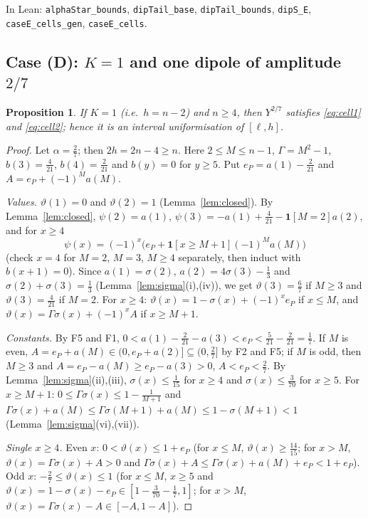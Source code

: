 \documentclass[11pt]{amsart}
\newtheorem{proposition}[lemma]{Proposition}
\theoremstyle{definition}
\theoremstyle{remark}
\numberwithin{equation}{section}
\newcommand{\ind}[1]{\mathbf{1}[#1]}
\newcommand{\lean}[1]{\texttt{#1}}
\begin{document}
In Lean: \lean{alphaStar\_bounds}, \lean{dipTail\_base}, \lean{dipTail\_bounds}, \lean{dipS\_E},
\lean{caseE\_cells\_gen}, \lean{caseE\_cells}.

\subsection{Case (D): \texorpdfstring{$K=1$}{K=1} and one dipole of amplitude \texorpdfstring{$2/7$}{2/7}}

\begin{proposition}\label{prop:caseD}
If $K=1$ (i.e.\ $h=n-2$) and $n\ge4$, then $Y^{2/7}$ satisfies \eqref{eq:cell1} and \eqref{eq:cell2};
hence it is an interval uniformisation of $[\ell,h]$.
\end{proposition}

\begin{proof}
Let $\alpha=\frac27$; then $2h=2n-4\ge n$. Here $2\le M\le n-1$, $\Gamma=M^2-1$, $b(3)=\frac4{21}$,
$b(4)=\frac2{21}$ and $b(y)=0$ for $y\ge5$. Put $e_P=a(1)-\frac2{21}$ and $A=e_P+(-1)^Ma(M)$.

\emph{Values.} $\vartheta(1)=0$ and $\vartheta(2)=1$ (Lemma~\ref{lem:closed}). By Lemma~\ref{lem:closed},
$\psi(2)=a(1)$, $\psi(3)=-a(1)+\frac4{21}-\ind{M=2}a(2)$, and for $x\ge4$
\[
  \psi(x)=(-1)^x\bigl(e_P+\ind{x\ge M+1}(-1)^Ma(M)\bigr)
\]
(check $x=4$ for $M=2$, $M=3$, $M\ge4$ separately, then induct with $b(x+1)=0$). Since $a(1)=\sigma(2)$,
$a(2)=4\sigma(3)-\frac13$ and $\sigma(2)+\sigma(3)=\frac13$ (Lemma~\ref{lem:sigma}(i),(iv)), we get
$\vartheta(3)=\frac67$ if $M\ge3$ and $\vartheta(3)=\frac4{21}$ if $M=2$. For $x\ge4$:
$\vartheta(x)=1-\sigma(x)+(-1)^xe_P$ if $x\le M$, and $\vartheta(x)=\Gamma\sigma(x)+(-1)^xA$ if $x\ge M+1$.

\emph{Constants.} By F5 and F1, $0<a(1)-\frac2{21}-a(3)<e_P<\frac5{21}-\frac2{21}=\frac17$. If $M$ is even,
$A=e_P+a(M)\in(0,e_P+a(2)]\subseteq(0,\frac27]$ by F2 and F5; if $M$ is odd, then $M\ge3$ and
$A=e_P-a(M)\ge e_P-a(3)>0$, $A<e_P<\frac27$. By Lemma~\ref{lem:sigma}(ii),(iii), $\sigma(x)\le\frac1{15}$ for
$x\ge4$ and $\sigma(x)\le\frac3{70}$ for $x\ge5$. For $x\ge M+1$: $0\le\Gamma\sigma(x)\le1-\frac1{M+1}$ and
$\Gamma\sigma(x)+a(M)\le\Gamma\sigma(M+1)+a(M)\le1-\sigma(M+1)<1$ (Lemma~\ref{lem:sigma}(vi),(vii)).

\emph{Single $x\ge4$.} Even $x$: $0<\vartheta(x)\le1+e_P$ (for $x\le M$, $\vartheta(x)\ge\frac{14}{15}$; for
$x>M$, $\vartheta(x)=\Gamma\sigma(x)+A>0$ and $\Gamma\sigma(x)+A\le\Gamma\sigma(x)+a(M)+e_P<1+e_P$). Odd $x$:
$-\frac27\le\vartheta(x)\le1$ (for $x\le M$, $x\ge5$ and $\vartheta(x)=1-\sigma(x)-e_P\in[1-\frac3{70}-\frac17,1]$;
for $x>M$, $\vartheta(x)=\Gamma\sigma(x)-A\in[-A,1-A]$).


\end{proof}
\end{document}
